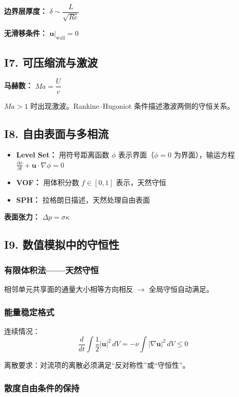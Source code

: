 \textbf{边界层厚度：} $\delta \sim \dfrac{L}{\sqrt{Re}}$

\textbf{无滑移条件：} $\mathbf{u}|_{\text{wall}} = 0$

\subsection{I7. 可压缩流与激波}

\textbf{马赫数：} $Ma = \dfrac{U}{c}$

$Ma > 1$ 时出现激波。Rankine--Hugoniot 条件描述激波两侧的守恒关系。

\subsection{I8. 自由表面与多相流}

\begin{itemize}
  \item \textbf{Level Set：} 用符号距离函数 $\phi$ 表示界面（$\phi = 0$ 为界面），输运方程 $\frac{\partial \phi}{\partial t} + \mathbf{u}\cdot\nabla\phi = 0$
  \item \textbf{VOF：} 用体积分数 $f \in [0,1]$ 表示，天然守恒
  \item \textbf{SPH：} 拉格朗日描述，天然处理自由表面
\end{itemize}

\textbf{表面张力：} $\Delta p = \sigma \kappa$

\subsection{I9. 数值模拟中的守恒性}

\subsubsection{有限体积法——天然守恒}

相邻单元共享面的通量大小相等方向相反 $\to$ 全局守恒自动满足。

\subsubsection{能量稳定格式}

连续情况：
\[
\frac{d}{dt}\int \frac{1}{2}|\mathbf{u}|^2\,dV = -\nu\int|\nabla\mathbf{u}|^2\,dV \leq 0
\]

离散要求：对流项的离散必须满足“反对称性”或“守恒性”。

\subsubsection{散度自由条件的保持}


